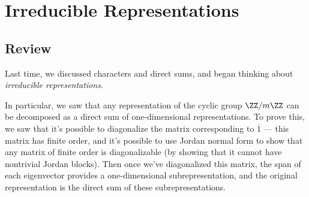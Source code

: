 








\section{Irreducible Representations}

\subsection{Review}

Last time, we discussed characters and direct sums, and began thinking about \emph{irreducible representations}. 

In particular, we saw that any representation of the cyclic group $\ZZ/m\ZZ$ can be decomposed as a direct sum of one-dimensional representations. To prove this, we saw that it's possible to diagonalize the matrix corresponding to $\overline{1}$ --- this matrix has finite order, and it's possible to use Jordan normal form to show that any matrix of finite order is diagonalizable (by showing that it cannot have nontrivial Jordan blocks). Then once we've diagonalized this matrix, the span of each eigenvector provides a one-dimensional subrepresentation, and the original representation is the direct sum of these subrepresentations. 

